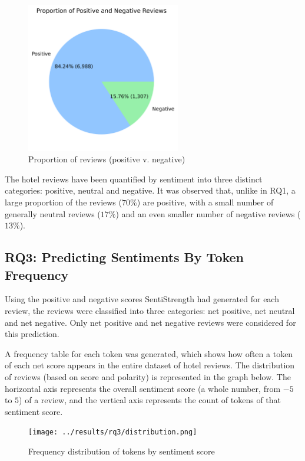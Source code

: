 \documentclass[12pt,bibliography=totocnumbered]{scrartcl}
\begin{document}
\begin{figure}[htpb]
	\begin{center}
		\includegraphics[width=0.6\textwidth]{../results/rq2/pie_chart_2part.png}
	\end{center}
	\caption{Proportion of reviews (positive v. negative)}
	\label{fig:reviews-pie4}
\end{figure}

The hotel reviews have been quantified by sentiment into three distinct categories:
positive, neutral and negative. It was observed that, unlike in RQ1, a large proportion
of the reviews ($70\%$) are positive, with a small number of generally neutral reviews ($17\%$)
and an even smaller number of negative reviews ($13\%$).

\subsection{RQ3: Predicting Sentiments By Token Frequency}
Using the positive and negative scores SentiStrength had generated for
each review, the reviews were classified into three categories: net positive,
net neutral and net negative. Only net positive and net negative reviews were
considered for this prediction.

A frequency table for each token was generated, which shows
how often a token of each net score appears in the entire dataset
of hotel reviews. The distribution of reviews (based on score and
polarity) is represented in the graph below. The horizontal axis represents
the overall sentiment score (a whole number, from $-5$ to $5$) of a review,
and the vertical axis represents the count of tokens of that sentiment score.

\begin{figure}[htpb]
	\begin{center}
		\texttt{[image: ../results/rq3/distribution.png]}
	\end{center}
	\caption{Frequency distribution of tokens by sentiment score}
	\label{fig:hist}
\end{figure}
\end{document}
